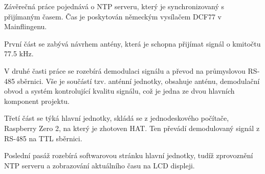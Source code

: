 Závěrečná práce pojednává o NTP serveru, který je synchronizovaný s přijímaným časem. Čas
je poskytován německým vysílačem DCF77 v Mainflingenu.

První část se zabývá návrhem antény, která je schopna přijímat signál o kmitočtu 77.5 kHz.

V druhé časti práce se rozebírá demodulaci signálu a převod na průmyslovou RS-485
sběrnici. Vše je součástí tzv. anténní jednotky, obsahuje anténu, demodulační obvod a systém kontrolující kvalitu
signálu, což je jedna ze dvou hlavních komponent projektu.

Třetí část se týká hlavní jednotky, skládá se z jednodeskového počítače, Raspberry Zero 2,
na který je zhotoven HAT. Ten převádí demodulovaný signál z RS-485 na TTL sběrnici.

Poslední pasáž rozebírá softwarovou stránku hlavní jednotky, tudíž zprovoznění NTP
serveru a zobrazování aktuálního času na LCD displeji.


